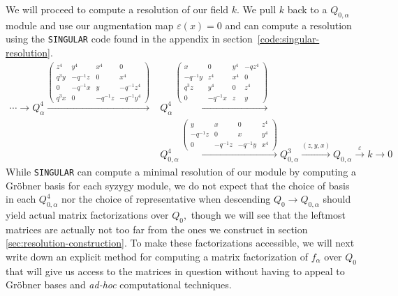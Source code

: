 \documentclass [11pt, proquest] {uwthesis}[2020/02/24]
\begin{document}
    We will proceed to compute a resolution of our field $k.$ We pull $k$ back to a $Q_{0,\alpha}$ module and use our augmentation map $\varepsilon(x)=0$ and can compute a resolution using the \texttt{SINGULAR} \cite{singular} code found in the appendix in section~\ref{code:singular-resolution}.
    \begin{align*}
        \cdots\to Q^4_\alpha\xrightarrow{\left(
        \begin{smallmatrix}
            z^4& y^4 & x^4 & 0\\
            q^3y & -q^{-1}z & 0 & x^4\\ 
            0 & -q^{-1}x & y & -q^{-1}z^4\\ 
            q^3x & 0 & -q^{-1}z & -q^{-1}y^4\end{smallmatrix}
        \right)} &Q^4_\alpha\xrightarrow{\left(
        \begin{smallmatrix}
            x& 0 & y^4 & -qz^4\\
            -q^{-1}y & z^4 & x^4 & 0\\ 
            q^3z & y^4 & 0 & z^4\\ 
            0 & -q^{-1}x & z & y\end{smallmatrix}
        \right)}\\&{Q_{0,\alpha}^4}\xrightarrow{\left(
        \begin{smallmatrix}
            y & x & 0 & z^4\\
            -q^{-1}z & 0 & x & y^4\\ 
            0 & -q^{-1}z & -q^{-1}y & x^4
        \end{smallmatrix}\right)}
        Q_{0,\alpha}^3\xrightarrow{(z,y,x)}Q_{0,\alpha}\xrightarrow{\varepsilon} k \to 0
    \end{align*}
    While \texttt{SINGULAR} can compute a minimal resolution of our module by computing a Gr\"obner basis for each syzygy module, we do not expect that the choice of basis in each $Q_{0,\alpha}^4$ nor the choice of representative when descending $Q_0\to Q_{0,\alpha}$ should yield actual matrix factorizations over $Q_0,$ though we will see that the leftmost matrices are actually not too far from the ones we construct in section \ref{sec:resolution-construction}. To make these factorizations accessible, we will next write down an explicit method for computing a matrix factorization of $f_\alpha$ over $Q_0$ that will give us access to the matrices in question without having to appeal to Gr\"obner bases and \textit{ad-hoc} computational techniques.
\end{document}
